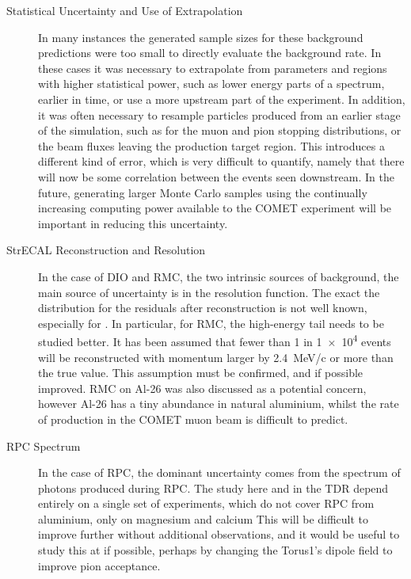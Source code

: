 \begin{description}
\item[Statistical Uncertainty and Use of Extrapolation]
In many instances the generated sample sizes for these background predictions were too small to directly evaluate the background rate.
In these cases it was necessary to extrapolate from parameters and regions with higher statistical power, such as lower energy parts of a spectrum, earlier in time, or use a more upstream part of the experiment.
In addition, it was often necessary to resample particles produced from an earlier stage of the simulation, such as for the muon and pion stopping distributions, or the beam fluxes leaving the production target region.
This introduces a different kind of error, which is very difficult to quantify, namely that there will now be some correlation between the events seen downstream.
In the future, generating larger Monte Carlo samples using the continually increasing computing power available to the COMET experiment will be important in reducing this uncertainty.

\item[StrECAL Reconstruction and Resolution]
In the case of \ac{DIO} and \ac{RMC}, the two intrinsic sources of background, the main source of uncertainty is in the resolution function.
The exact the distribution for the residuals after reconstruction is not well known, especially for \phaseII.
In particular, for \ac{RMC}, the high-energy tail needs to be studied better. 
It has been assumed that fewer than 1 in \num{1e4} events will be reconstructed with momentum larger by 2.4~MeV/c or more than the true value.
This assumption must be confirmed, and if possible improved.
RMC on Al-26 was also discussed as a potential concern, however Al-26 has a tiny abundance in natural aluminium, whilst the rate of production in the COMET muon beam is difficult to predict.

\item[RPC Spectrum]
In the case of \acf{RPC}, the dominant uncertainty comes from the spectrum of photons produced during RPC.
The study here and in the \phaseI TDR depend entirely on a single set of experiments, which do not cover RPC from aluminium, only on magnesium and calcium
This will be difficult to improve further without additional observations, and it would be useful to study this at \phaseI if possible, perhaps by changing the Torus1's dipole field to improve pion acceptance.


\end{description}
